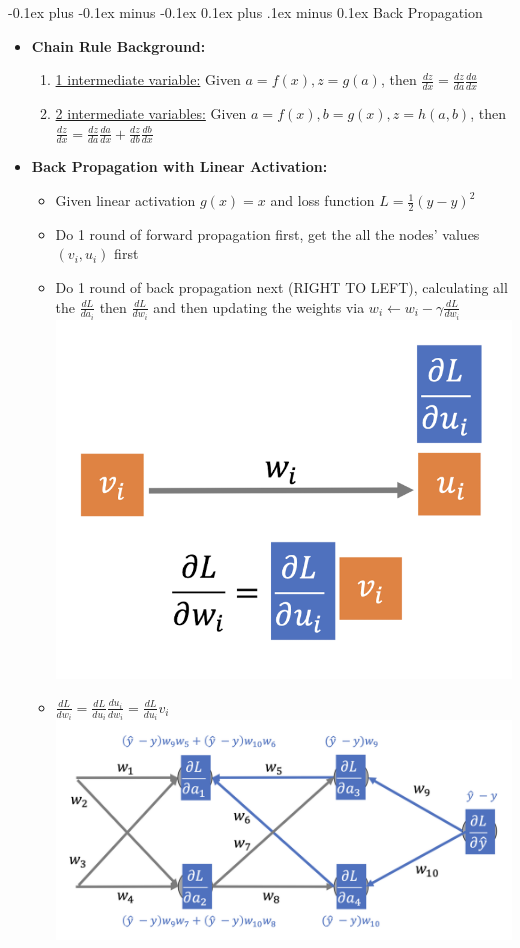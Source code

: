 \documentclass[landscape]{article}
\makeatletter
\renewcommand{\subsection}{\@startsection{subsection}{2}{0mm}%
  {-0.1ex plus -0.1ex minus -0.1ex}%
  {0.1ex plus .1ex minus 0.1ex}%
{\normalfont\scriptsize\bfseries}}
\makeatother
\begin{document}
\begin{multicols*}{5}
        \subsection{Back Propagation}
        \begin{itemize}
          \item \textbf{Chain Rule Background:}
          \begin{enumerate}
            \item \underline{1 intermediate variable:} Given $a=f(x), z=g(a)$, then $\frac{dz}{dx} = \frac{dz}{da}\frac{da}{dx}$
            \item \underline{2 intermediate variables:} Given $a=f(x), b=g(x), z=h(a,b)$, then $\frac{dz}{dx} = \frac{dz}{da}\frac{da}{dx} + \frac{dz}{db}\frac{db}{dx}$
          \end{enumerate}
          \item \textbf{Back Propagation with Linear Activation:}
          \begin{itemize}
            \item Given linear activation $g(x)=x$ and loss function $L=\frac{1}{2}(\hat{y} - y)^2$
            \item Do 1 round of forward propagation first, get the all the nodes' values $(v_i, u_i)$ first
            \item Do 1 round of back propagation next (RIGHT TO LEFT), calculating all the $\frac{dL}{da_i}$ then $\frac{dL}{dw_i}$ and then updating the weights via $w_i \leftarrow w_i - \gamma \frac{dL}{dw_i}$ \\
            \includegraphics[width=0.45\linewidth]{22_backprop_single_unit.png}
            \item $\frac{dL}{dw_i}=\frac{dL}{du_i}\frac{du_i}{dw_i}=\frac{dL}{du_i}v_i$
            \includegraphics[width=0.85\linewidth]{23_backprog_linear.png}

\end{itemize}
\end{itemize}
\end{multicols*}
\end{document}
